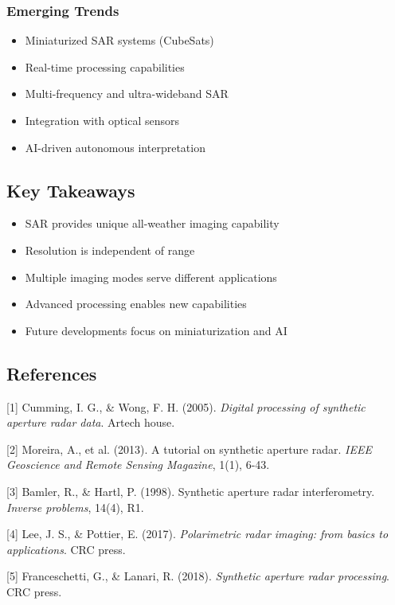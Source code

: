 \documentclass[a0paper,landscape,20pt]{extarticle}
\begin{document}
\begin{multicols}{4}
\subsubsection{Emerging Trends}
\begin{itemize}
  \item Miniaturized SAR systems (CubeSats)
  \item Real-time processing capabilities
  \item Multi-frequency and ultra-wideband SAR
  \item Integration with optical sensors
  \item AI-driven autonomous interpretation
\end{itemize}

\subsection{Key Takeaways}
\begin{itemize}
  \item SAR provides unique all-weather imaging capability
  \item Resolution is independent of range
  \item Multiple imaging modes serve different applications
  \item Advanced processing enables new capabilities
  \item Future developments focus on miniaturization and AI
\end{itemize}

\subsection{References}
\small
\setlength{\parindent}{0pt}
\setlength{\parskip}{0.3cm}

[1] Cumming, I. G., \& Wong, F. H. (2005). \textit{Digital processing of synthetic aperture radar data}. Artech house.

[2] Moreira, A., et al. (2013). A tutorial on synthetic aperture radar. \textit{IEEE Geoscience and Remote Sensing Magazine}, 1(1), 6-43.

[3] Bamler, R., \& Hartl, P. (1998). Synthetic aperture radar interferometry. \textit{Inverse problems}, 14(4), R1.

[4] Lee, J. S., \& Pottier, E. (2017). \textit{Polarimetric radar imaging: from basics to applications}. CRC press.

[5] Franceschetti, G., \& Lanari, R. (2018). \textit{Synthetic aperture radar processing}. CRC press.


\end{multicols}
\end{document}
